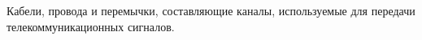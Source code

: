 Кабели, провода и перемычки, составляющие каналы,
используемые для передачи телекоммуникационных сигналов.